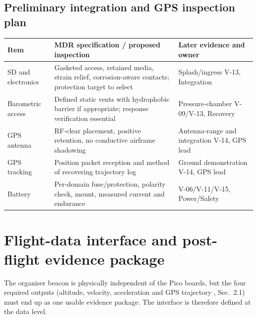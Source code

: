 \subsection*{Preliminary integration and GPS inspection plan}
\small
\begin{tabularx}{\linewidth}{@{}L{33mm}Y L{45mm}@{}}
\toprule{}\textbf{Item}&\textbf{MDR specification / proposed inspection}&\textbf{Later evidence and owner}\\\midrule
SD and electronics & Gasketed access, retained media, strain relief, corrosion-aware contacts; protection target to select & Splash/ingress V-13, Integration\\
Barometric access & Defined static vents with hydrophobic barrier if appropriate; response verification essential & Pressure-chamber V-09/V-13, Recovery\\
GPS antenna & RF-clear placement, positive retention, no conductive airframe shadowing & Antenna-range and integration V-14, GPS lead\\
GPS tracking & Position packet reception and method of recovering trajectory log & Ground demonstration V-14, GPS lead\\
Battery & Per-domain fuse/protection, polarity check, mount, measured current and endurance & V-06/V-11/V-15, Power/Safety\\\bottomrule
\end{tabularx}\normalsize


\section{Flight-data interface and post-flight evidence package}
\label{sec:dataflow}
The organiser beacon is physically independent of the Pico boards, but the four required outputs (altitude, velocity, acceleration and GPS trajectory \cite{rtc2027app03}, Sec.~2.1) must end up as one usable evidence package. The interface is therefore defined at the data level.

